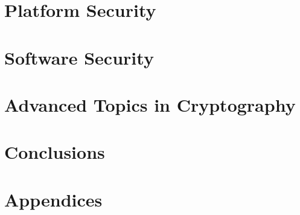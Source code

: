 \documentclass[
letterpaper, %
oneside,
nobib
]{tufte-book}
\begin{document}
\part{Platform Security} 






\part{Software Security}

 
% 


\part{Advanced Topics in Cryptography}



\part{Conclusions}



\appendix
\part{Appendices}


\backmatter

\printbibliography
\end{document}
